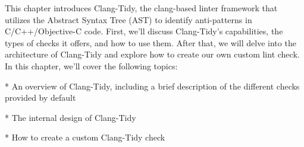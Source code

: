 \begin{markdown}

This chapter introduces Clang-Tidy, the clang-based linter framework that utilizes the Abstract Syntax Tree (AST) to identify anti-patterns in C/C++/Objective-C code. First, we'll discuss Clang-Tidy's capabilities, the types of checks it offers, and how to use them. After that, we will delve into the architecture of Clang-Tidy and explore how to create our own custom lint check. In this chapter, we'll cover the following topics:

* An overview of Clang-Tidy, including a brief description of the different checks provided by default

* The internal design of Clang-Tidy

* How to create a custom Clang-Tidy check

\end{markdown}